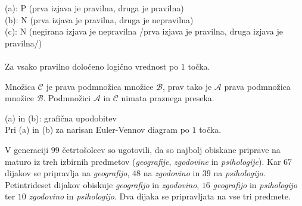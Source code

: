 \documentclass[addpoints]{exam}
\begin{document}
\begin{questions}
    \begin{solution}
        (a): P (prva izjava je pravilna, druga je pravilna) \\
        (b): N (prva izjava je pravilna, druga je nepravilna) \\
        (c): N (negirana izjava je nepravilna /prva izjava je pravilna, druga izjava je pravilna/) \\ \\
        Za vsako pravilno določeno logično vrednost po $1$ točka.
    \end{solution}



    \newpage



    \question
    Množica $\mathcal{C}$ je prava podmnožica množice $\mathcal{B}$, prav tako je $\mathcal{A}$ prava podmnožica množice $\mathcal{B}$. Podmnožici $\mathcal{A}$ in $\mathcal{C}$ nimata praznega preseka.

    \begin{solution}[8cm]
        (a) in (b): grafična upodobitev \\
        Pri (a) in (b) za narisan Euler-Vennov diagram po $1$ točka.
    \end{solution}


    \question
    V generaciji $99$ četrtošolcev so ugotovili, da so najbolj obiskane priprave na maturo iz treh izbirnih predmetov (\textit{geografije}, \textit{zgodovine} in \textit{psihologije}).
    Kar $67$ dijakov se pripravlja na \textit{geografijo}, $48$ na \textit{zgodovino} in $39$ na \textit{psihologijo}. Petintrideset dijakov obiskuje \textit{geografijo} in \textit{zgodovino},
    $16$ \textit{geografijo} in \textit{psihologijo} ter $10$ \textit{zgodovino} in \textit{psihologijo}. Dva dijaka se pripravljata na vse tri predmete.
    \begin{parts}

\end{parts}
\end{questions}
\end{document}
